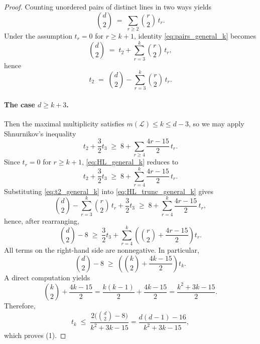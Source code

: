 \documentclass[10pt,a4paper]{amsart}
\begin{document}
\begin{proof}
Counting unordered pairs of distinct lines in two ways yields
\begin{equation}\label{eq:pairs_general_k}
\binom{d}{2} \;=\; \sum_{r\ge 2}\binom{r}{2}\,t_r.
\end{equation}
Under the assumption $t_r=0$ for $r\ge k+1$, identity \eqref{eq:pairs_general_k} becomes
\begin{equation}\label{eq:pairs_trunc_general_k}
\binom{d}{2} \;=\; t_2 + \sum_{r=3}^{k}\binom{r}{2}\,t_r,
\end{equation}
hence
\begin{equation}\label{eq:t2_general_k}
t_2 \;=\; \binom{d}{2} - \sum_{r=3}^{k}\binom{r}{2}\,t_r.
\end{equation}

\medskip
\paragraph{The case $d\ge k+3$.}
Then the maximal multiplicity satisfies $m(\mathcal L)\le k\le d-3$, so we may apply Shnurnikov's inequality
\begin{equation}\label{eq:HL_general_k}
t_2 + \frac{3}{2}t_3 \;\ge\; 8 + \sum_{r\ge 4}\frac{4r-15}{2}\,t_r.
\end{equation}
Since $t_r=0$ for $r\ge k+1$, \eqref{eq:HL_general_k} reduces to
\begin{equation}\label{eq:HL_trunc_general_k}
t_2 + \frac{3}{2}t_3 \;\ge\; 8 + \sum_{r=4}^{k}\frac{4r-15}{2}\,t_r.
\end{equation}
Substituting \eqref{eq:t2_general_k} into \eqref{eq:HL_trunc_general_k} gives
\[
\binom{d}{2}
-
\sum_{r=3}^{k}\binom{r}{2}\,t_r
+
\frac{3}{2}t_3
\;\ge\;
8 + \sum_{r=4}^{k}\frac{4r-15}{2}\,t_r,
\]
hence, after rearranging,
\begin{equation}\label{eq:rearranged_general_k}
\binom{d}{2} - 8
\;\ge\;
\frac{3}{2}t_3
+
\sum_{r=4}^{k}
\left(
\binom{r}{2} + \frac{4r-15}{2}
\right)t_r.
\end{equation}
All terms on the right-hand side are nonnegative. In particular,
\[
\binom{d}{2} - 8
\;\ge\;
\left(
\binom{k}{2} + \frac{4k-15}{2}
\right)t_k.
\]
A direct computation yields
\[
\binom{k}{2} + \frac{4k-15}{2}
=
\frac{k(k-1)}{2} + \frac{4k-15}{2}
=
\frac{k^2+3k-15}{2}.
\]
Therefore,
\[
t_k
\;\le\;
\frac{2\bigl(\binom{d}{2}-8\bigr)}{k^2+3k-15}
=
\frac{d(d-1)-16}{k^2+3k-15},
\]
which proves (1).

\medskip

\end{proof}
\end{document}
